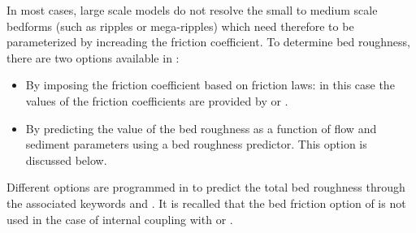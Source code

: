 In most cases, large scale models do not resolve the small to medium
scale bedforms (such as ripples or mega-ripples) which need therefore to be parameterized by increading the friction coefficient. To determine bed roughness, there are two options available in \sisyphe{}:
\begin{itemize}
\item By imposing the friction coefficient based on friction laws: in this case the values of the friction coefficients are provided by  or .
\item By predicting the value of the bed roughness as a function of flow and sediment parameters using a bed roughness predictor. This option is discussed below.
\end{itemize}
Different options are programmed in \sisyphe to predict the total bed
roughness through the associated keywords  and . It is recalled that the bed friction option of \sisyphe is not
used in the case of internal coupling with  or .
